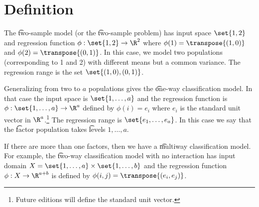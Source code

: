 
\section*{Definition}

The \t{two-sample model} (or the \t{two-sample problem}) has input space $\set{1, 2}$ and regression function $\phi : \set{1, 2} \to \R ^2$ where $\phi (1) = \transpose{(1, 0)}$ and $\phi (2) = \transpose{(0, 1)}$.
In this case, we model two populations (corresponding to 1 and 2) with different means but a common variance.
The regression range is the set $\set{(1, 0), (0, 1)}$.

Generalizing from two to $a$ populations gives the \t{one-way classification model}.
In that case the input space is $\set{1, \dots , a}$ and the regression function is $\phi : \set{1, \dots , a} \to \R ^a$ defined by $\phi (i) = e_i$ where $e_i$ is the standard unit vector in $\R ^a$.\footnote{Future editions will define the standard unit vector.}
The regression range is $\set{e_1, \dots , e_a}$.
In this case we say that the \t{factor} population takes \t{levels} $1, \dots , a$.

If there are more than one factors, then we have a \t{multiway classification model}.
For example, the \t{two-way classification model with no interaction} has input domain $X = \set{1, \dots , a} \times \set{1, \dots , b}$ and the regression function $\phi : X \to \R ^{a + b}$ is defined by $\phi (i, j) = \transpose{(e_i, e_j)}$.

\blankpage